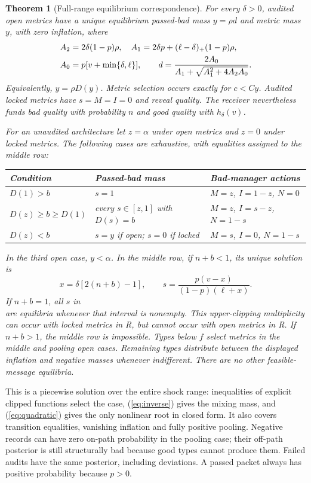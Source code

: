 \documentclass[11pt]{article}
\newtheorem{theorem}{Theorem}
\begin{document}
\begin{theorem}[Full-range equilibrium correspondence]\label{thm:global}
For every $\delta>0$, audited open metrics have a unique equilibrium passed-bad mass $y=\rho d$ and metric mass $y$, with zero inflation, where
\begin{align}
A_2&=2\delta(1-p)\rho,\quad
A_1=2\delta p+(\ell-\delta)_+(1-p)\rho,\notag\\
A_0&=p[v+\min\{\delta,\ell\}],\qquad
d=\frac{2A_0}{A_1+\sqrt{A_1^2+4A_2A_0}}.\label{eq:quadratic}
\end{align}
Equivalently, $y=\rho D(y)$. Metric selection occurs exactly for $c<Cy$. Audited locked metrics have $s=M=I=0$ and reveal quality. The receiver nevertheless funds bad quality with probability $n$ and good quality with $h_\delta(v)$.

For an unaudited architecture let $z=\alpha$ under open metrics and $z=0$ under locked metrics. The following cases are exhaustive, with equalities assigned to the middle row:
\begin{center}\small
\begin{tabular}{p{}p{}p{}}\toprule
Condition & Passed-bad mass & Bad-manager actions\\\midrule
$D(1)>b$ & $s=1$ & $M=z$, $I=1-z$, $N=0$\\
$D(z)\geq b\geq D(1)$ & every $s\in[z,1]$ with $D(s)=b$ & $M=z$, $I=s-z$, $N=1-s$\\
$D(z)<b$ & $s=y$ if open; $s=0$ if locked & $M=s$, $I=0$, $N=1-s$\\\bottomrule
\end{tabular}\end{center}
In the third open case, $y<\alpha$. In the middle row, if $n+b<1$, its unique solution is
\begin{equation}
x=\delta[2(n+b)-1],\qquad s=\frac{p(v-x)}{(1-p)(\ell+x)}.\label{eq:inverse}
\end{equation}
If $n+b=1$, all $s$ in
\begin{equation}[z,\min\{1,p(v-\delta)/((1-p)(\ell+\delta))\}]\label{eq:plateau}
\end{equation}
are equilibria whenever that interval is nonempty. This upper-clipping multiplicity can occur with locked metrics in R, but cannot occur with open metrics in R. If $n+b>1$, the middle row is impossible. Types below $f$ select metrics in the middle and pooling open cases. Remaining types distribute between the displayed inflation and negative masses whenever indifferent. There are no other feasible-message equilibria.
\end{theorem}
This is a piecewise solution over the entire shock range: inequalities of explicit clipped functions select the case, (\ref{eq:inverse}) gives the mixing mass, and (\ref{eq:quadratic}) gives the only nonlinear root in closed form. It also covers transition equalities, vanishing inflation and fully positive pooling. Negative records can have zero on-path probability in the pooling case; their off-path posterior is still structurally bad because good types cannot produce them. Failed audits have the same posterior, including deviations. A passed packet always has positive probability because $p>0$.
\end{document}
